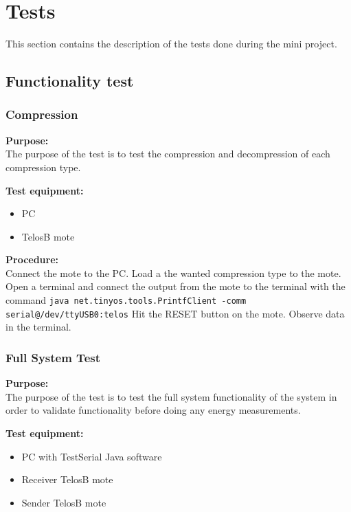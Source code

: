 \section{Tests}
This section contains the description of the tests done during the mini project.



\subsection{Functionality test}



\subsubsection{Compression}

\textbf{Purpose:}\\
The purpose of the test is to test the compression and decompression of each compression type.

\textbf{Test equipment:}
\begin{itemize}
\item PC 
\item TelosB mote
\end{itemize}

\textbf{Procedure:}\\
Connect the mote to the PC.
Load a the wanted compression type to the mote.
Open a terminal and connect the output from the mote to the terminal with the command \texttt{java net.tinyos.tools.PrintfClient -comm serial@/dev/ttyUSB0:telos}
Hit the RESET button on the mote.
Observe data in the terminal.




\subsubsection{Full System Test}
\textbf{Purpose:}\\
The purpose of the test is to test the full system functionality of the system in order to validate functionality before doing any energy measurements.

\textbf{Test equipment:}
\begin{itemize}
\item PC with TestSerial Java software
\item Receiver TelosB mote
\item Sender TelosB mote
\end{itemize}

